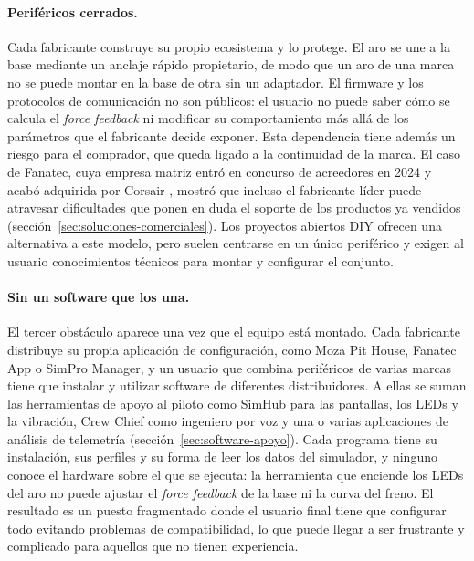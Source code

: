 \paragraph{Periféricos cerrados.}
Cada fabricante construye su propio ecosistema y lo protege. El aro se une a la base mediante un anclaje rápido propietario, de modo que un aro de una marca no se puede montar en la base de otra sin un adaptador. El firmware y los protocolos de comunicación no son públicos: el usuario no puede saber cómo se calcula el \textit{force feedback} ni modificar su comportamiento más allá de los parámetros que el fabricante decide exponer. Esta dependencia tiene además un riesgo para el comprador, que queda ligado a la continuidad de la marca. El caso de Fanatec, cuya empresa matriz entró en concurso de acreedores en 2024 y acabó adquirida por Corsair \parencite{businesswire_2024_corsair_fanatec}, mostró que incluso el fabricante líder puede atravesar dificultades que ponen en duda el soporte de los productos ya vendidos (sección~\ref{sec:soluciones-comerciales}). Los proyectos abiertos DIY ofrecen una alternativa a este modelo, pero suelen centrarse en un único periférico y exigen al usuario conocimientos técnicos para montar y configurar el conjunto.

\paragraph{Sin un software que los una.}
El tercer obstáculo aparece una vez que el equipo está montado. Cada fabricante distribuye su propia aplicación de configuración, como Moza Pit House, Fanatec App o SimPro Manager, y un usuario que combina periféricos de varias marcas tiene que instalar y utilizar software de diferentes distribuidores. A ellas se suman las herramientas de apoyo al piloto como SimHub para las pantallas, los LEDs y la vibración, Crew Chief como ingeniero por voz y una o varias aplicaciones de análisis de telemetría (sección~\ref{sec:software-apoyo}). Cada programa tiene su instalación, sus perfiles y su forma de leer los datos del simulador, y ninguno conoce el hardware sobre el que se ejecuta: la herramienta que enciende los LEDs del aro no puede ajustar el \textit{force feedback} de la base ni la curva del freno. El resultado es un puesto fragmentado donde el usuario final tiene que configurar todo evitando problemas de compatibilidad, lo que puede llegar a ser frustrante y complicado para aquellos que no tienen experiencia.


